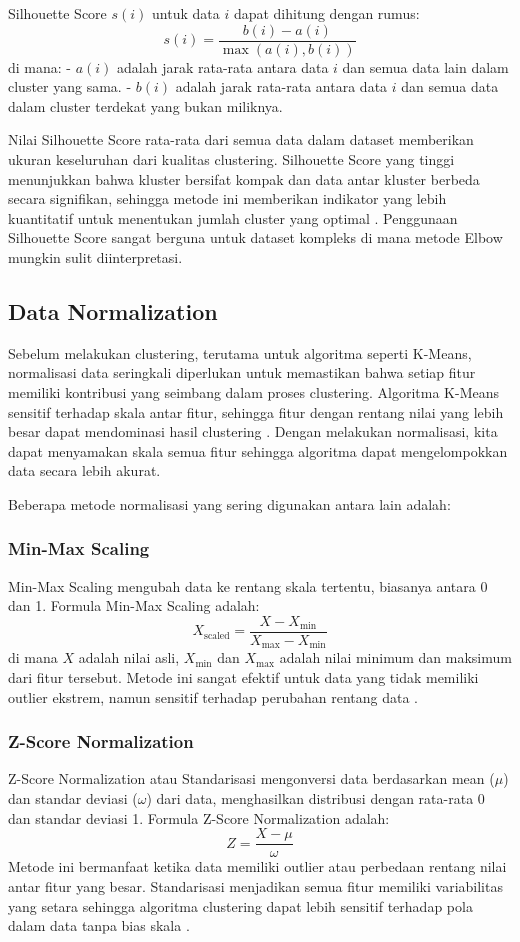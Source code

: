 Silhouette Score $s(i)$ untuk data $i$ dapat dihitung dengan rumus:
\[
s(i) = \frac{b(i) - a(i)}{\max(a(i), b(i))}
\]
di mana:
- $a(i)$ adalah jarak rata-rata antara data $i$ dan semua data lain dalam cluster yang sama.
- $b(i)$ adalah jarak rata-rata antara data $i$ dan semua data dalam cluster terdekat yang bukan miliknya.

Nilai Silhouette Score rata-rata dari semua data dalam dataset memberikan ukuran keseluruhan dari kualitas clustering. Silhouette Score yang tinggi menunjukkan bahwa kluster bersifat kompak dan data antar kluster berbeda secara signifikan, sehingga metode ini memberikan indikator yang lebih kuantitatif untuk menentukan jumlah cluster yang optimal \cite{SilhoetterScore}. Penggunaan Silhouette Score sangat berguna untuk dataset kompleks di mana metode Elbow mungkin sulit diinterpretasi.

\subsection{Data Normalization}
Sebelum melakukan clustering, terutama untuk algoritma seperti K-Means, normalisasi data seringkali diperlukan untuk memastikan bahwa setiap fitur memiliki kontribusi yang seimbang dalam proses clustering. Algoritma K-Means sensitif terhadap skala antar fitur, sehingga fitur dengan rentang nilai yang lebih besar dapat mendominasi hasil clustering \cite{ComparationMinMaxZScore}. Dengan melakukan normalisasi, kita dapat menyamakan skala semua fitur sehingga algoritma dapat mengelompokkan data secara lebih akurat.

Beberapa metode normalisasi yang sering digunakan antara lain adalah:

\subsubsection{Min-Max Scaling}
Min-Max Scaling mengubah data ke rentang skala tertentu, biasanya antara 0 dan 1. Formula Min-Max Scaling adalah:
\[
X_{\text{scaled}} = \frac{X - X_{\text{min}}}{X_{\text{max}} - X_{\text{min}}}
\]
di mana $X$ adalah nilai asli, $X_{\text{min}}$ dan $X_{\text{max}}$ adalah nilai minimum dan maksimum dari fitur tersebut. Metode ini sangat efektif untuk data yang tidak memiliki outlier ekstrem, namun sensitif terhadap perubahan rentang data \cite{HanMinMaxScaling}.

\subsubsection{Z-Score Normalization}
Z-Score Normalization atau Standarisasi mengonversi data berdasarkan mean ($\mu$) dan standar deviasi ($\omega$) dari data, menghasilkan distribusi dengan rata-rata 0 dan standar deviasi 1. Formula Z-Score Normalization adalah:
\[
Z = \frac{X - \mu}{\omega}
\]
Metode ini bermanfaat ketika data memiliki outlier atau perbedaan rentang nilai antar fitur yang besar. Standarisasi menjadikan semua fitur memiliki variabilitas yang setara sehingga algoritma clustering dapat lebih sensitif terhadap pola dalam data tanpa bias skala \cite{GarcíaZ_Score}.

